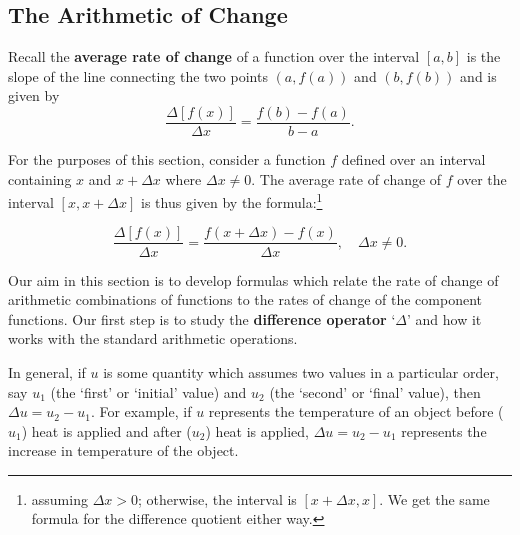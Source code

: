 \documentclass{ximera}
\begin{document}
\subsection{The Arithmetic of Change}
\label{rocarithmetic}

Recall the \textbf{average rate of change} of a function over the interval $[a,b]$  is the slope of the line connecting the two points $(a, f(a))$ and $(b, f(b))$ and is given by \[ \dfrac{\Delta[f(x)]}{\Delta x} = \dfrac{f(b)-f(a)}{b-a}.\]

\medskip  



For the purposes of this section, consider a function $f$ defined over an interval containing $x$ and $x+\Delta x$ where $\Delta x \neq 0$. The average rate of change of $f$ over the interval $[x,x+\Delta x]$ is thus given by the formula:\footnote{assuming $\Delta x>0$;  otherwise, the interval is $[x+\Delta x, x]$.  We get the same formula for the difference quotient either way.}

\[ \dfrac{\Delta[f(x)]}{\Delta x} = \dfrac{f(x+\Delta x)-f(x)}{\Delta x}, \quad \Delta x \neq 0.\]

\medskip

Our aim in this section is to develop formulas which relate the rate of change of arithmetic combinations of functions to the rates of change of the component functions.   Our first step is to study the \textbf{difference operator}  `$\Delta$'  and how it works with the standard arithmetic operations.  

\medskip

In general, if $u$ is some quantity which assumes two values in a particular order, say $u_{1}$ (the `first' or `initial' value) and $u_{2}$ (the `second' or `final' value), then $\Delta u = u_{2} - u_{1}$.  For example, if $u$ represents the temperature of an object before ($u_{1}$) heat is applied and after ($u_{2}$) heat is applied,  $\Delta u = u_{2} - u_{1}$ represents the increase in temperature of the object.
\end{document}
